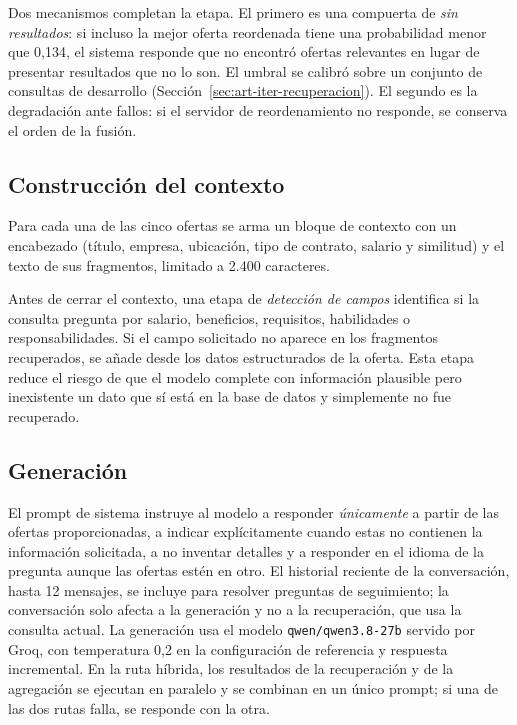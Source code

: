 Dos mecanismos completan la etapa. El primero es una compuerta de \emph{sin resultados}: si incluso la mejor oferta reordenada tiene una probabilidad menor que 0,134, el sistema responde que no encontró ofertas relevantes en lugar de presentar resultados que no lo son. El umbral se calibró sobre un conjunto de consultas de desarrollo (Sección~\ref{sec:art-iter-recuperacion}). El segundo es la degradación ante fallos: si el servidor de reordenamiento no responde, se conserva el orden de la fusión.

\subsection{Construcción del contexto}

Para cada una de las cinco ofertas se arma un bloque de contexto con un encabezado (título, empresa, ubicación, tipo de contrato, salario y similitud) y el texto de sus fragmentos, limitado a 2.400 caracteres.

Antes de cerrar el contexto, una etapa de \emph{detección de campos} identifica si la consulta pregunta por salario, beneficios, requisitos, habilidades o responsabilidades. Si el campo solicitado no aparece en los fragmentos recuperados, se añade desde los datos estructurados de la oferta. Esta etapa reduce el riesgo de que el modelo complete con información plausible pero inexistente un dato que sí está en la base de datos y simplemente no fue recuperado.

\subsection{Generación}

El prompt de sistema instruye al modelo a responder \emph{únicamente} a partir de las ofertas proporcionadas, a indicar explícitamente cuando estas no contienen la información solicitada, a no inventar detalles y a responder en el idioma de la pregunta aunque las ofertas estén en otro. El historial reciente de la conversación, hasta 12 mensajes, se incluye para resolver preguntas de seguimiento; la conversación solo afecta a la generación y no a la recuperación, que usa la consulta actual. La generación usa el modelo \texttt{qwen/qwen3.8-27b} servido por Groq, con temperatura 0,2 en la configuración de referencia y respuesta incremental. En la ruta híbrida, los resultados de la recuperación y de la agregación se ejecutan en paralelo y se combinan en un único prompt; si una de las dos rutas falla, se responde con la otra.

